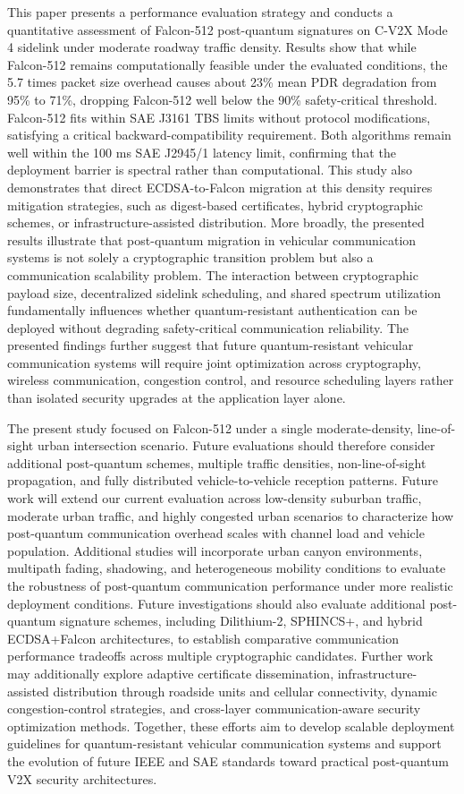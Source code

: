 \documentclass[conference]{IEEEtran}
\begin{document}
This paper presents a performance evaluation strategy and conducts a quantitative assessment of Falcon-512 post-quantum signatures on C-V2X Mode 4 sidelink under moderate roadway traffic density. Results show that while Falcon-512 remains computationally feasible under the evaluated conditions, the 5.7 times packet size overhead causes about 23\% mean PDR degradation from 95\% to 71\%, dropping Falcon-512 well below the 90\% safety-critical threshold. Falcon-512 fits within SAE J3161 TBS limits without protocol modifications, satisfying a critical backward-compatibility requirement. Both algorithms remain well within the 100 ms SAE J2945/1 latency limit, confirming that the deployment barrier is spectral rather than computational. This study also demonstrates that direct ECDSA-to-Falcon migration at this density requires mitigation strategies, such as digest-based certificates, hybrid cryptographic schemes, or infrastructure-assisted distribution. More broadly, the presented results illustrate that post-quantum migration in vehicular communication systems is not solely a cryptographic transition problem but also a communication scalability problem. The interaction between cryptographic payload size, decentralized sidelink scheduling, and shared spectrum utilization fundamentally influences whether quantum-resistant authentication can be deployed without degrading safety-critical communication reliability. The presented findings further suggest that future quantum-resistant vehicular communication systems will require joint optimization across cryptography, wireless communication, congestion control, and resource scheduling layers rather than isolated security upgrades at the application layer alone.

The present study focused on Falcon-512 under a single moderate-density, line-of-sight urban intersection scenario. Future evaluations should therefore consider additional post-quantum schemes, multiple traffic densities, non-line-of-sight propagation, and fully distributed vehicle-to-vehicle reception patterns. Future work will extend our current evaluation across low-density suburban traffic, moderate urban traffic, and highly congested urban scenarios to characterize how post-quantum communication overhead scales with channel load and vehicle population. Additional studies will incorporate urban canyon environments, multipath fading, shadowing, and heterogeneous mobility conditions to evaluate the robustness of post-quantum communication performance under more realistic deployment conditions. Future investigations should also evaluate additional post-quantum signature schemes, including Dilithium-2, SPHINCS+, and hybrid ECDSA+Falcon architectures, to establish comparative communication performance tradeoffs across multiple cryptographic candidates. Further work may additionally explore adaptive certificate dissemination, infrastructure-assisted distribution through roadside units and cellular connectivity, dynamic congestion-control strategies, and cross-layer communication-aware security optimization methods. Together, these efforts aim to develop scalable deployment guidelines for quantum-resistant vehicular communication systems and support the evolution of future IEEE and SAE standards toward practical post-quantum V2X security architectures.
\end{document}
